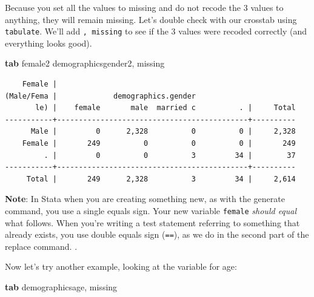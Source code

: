 \documentclass[
]{book}
\newenvironment{Shaded}{\begin{snugshade}}{\end{snugshade}}
\newcommand{\FunctionTok}[1]{\textcolor[rgb]{0.00,0.00,0.00}{#1}}
\newcommand{\KeywordTok}[1]{\textcolor[rgb]{0.13,0.29,0.53}{\textbf{#1}}}
\newcommand{\NormalTok}[1]{#1}
\begin{document}
Because you set all the values to missing and do not recode the 3 values to anything, they will remain missing. Let's double check with our crosstab using \texttt{tabulate}. We'll add \texttt{,\ missing} to see if the 3 values were recoded correctly (and everything looks good).

\begin{Shaded}
\begin{Highlighting}[]
\KeywordTok{tab}\NormalTok{ female2 demographicsgender2, }\FunctionTok{missing}
\end{Highlighting}
\end{Shaded}

\begin{verbatim}
    Female |
(Male/Fema |             demographics.gender
       le) |    female       male  married c          . |     Total
-----------+--------------------------------------------+----------
      Male |         0      2,328          0          0 |     2,328 
    Female |       249          0          0          0 |       249 
         . |         0          0          3         34 |        37 
-----------+--------------------------------------------+----------
     Total |       249      2,328          3         34 |     2,614 
\end{verbatim}

\textbf{Note}: In Stata when you are creating something new, as with the generate command, you use a single equals sign. Your new variable \texttt{female} \emph{should equal} what follows. When you're writing a test statement referring to something that already exists, you use double equals sign (\texttt{==}), as we do in the second part of the replace command. .

Now let's try another example, looking at the variable for age:

\begin{Shaded}
\begin{Highlighting}[]
\KeywordTok{tab}\NormalTok{ demographicsage, }\FunctionTok{missing}
\end{Highlighting}
\end{Shaded}
\end{document}
